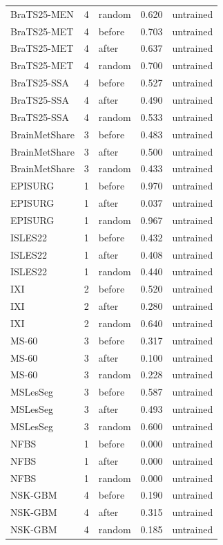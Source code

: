 \begin{tabular}{lrlrl}
BraTS25-MEN & 4 & random & 0.620 & untrained \\
BraTS25-MET & 4 & before & 0.703 & untrained \\
BraTS25-MET & 4 & after & 0.637 & untrained \\
BraTS25-MET & 4 & random & 0.700 & untrained \\
BraTS25-SSA & 4 & before & 0.527 & untrained \\
BraTS25-SSA & 4 & after & 0.490 & untrained \\
BraTS25-SSA & 4 & random & 0.533 & untrained \\
BrainMetShare & 3 & before & 0.483 & untrained \\
BrainMetShare & 3 & after & 0.500 & untrained \\
BrainMetShare & 3 & random & 0.433 & untrained \\
EPISURG & 1 & before & 0.970 & untrained \\
EPISURG & 1 & after & 0.037 & untrained \\
EPISURG & 1 & random & 0.967 & untrained \\
ISLES22 & 1 & before & 0.432 & untrained \\
ISLES22 & 1 & after & 0.408 & untrained \\
ISLES22 & 1 & random & 0.440 & untrained \\
IXI & 2 & before & 0.520 & untrained \\
IXI & 2 & after & 0.280 & untrained \\
IXI & 2 & random & 0.640 & untrained \\
MS-60 & 3 & before & 0.317 & untrained \\
MS-60 & 3 & after & 0.100 & untrained \\
MS-60 & 3 & random & 0.228 & untrained \\
MSLesSeg & 3 & before & 0.587 & untrained \\
MSLesSeg & 3 & after & 0.493 & untrained \\
MSLesSeg & 3 & random & 0.600 & untrained \\
NFBS & 1 & before & 0.000 & untrained \\
NFBS & 1 & after & 0.000 & untrained \\
NFBS & 1 & random & 0.000 & untrained \\
NSK-GBM & 4 & before & 0.190 & untrained \\
NSK-GBM & 4 & after & 0.315 & untrained \\
NSK-GBM & 4 & random & 0.185 & untrained \\

\end{tabular}
